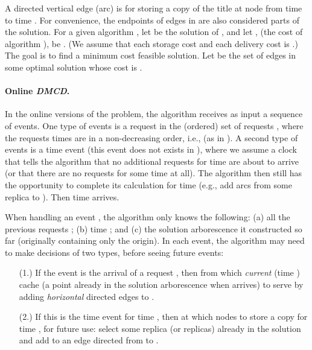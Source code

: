 \documentclass[11pt]{article}
\begin{document}
A directed vertical edge (arc)  is for storing a copy of the title at node  from time  to time .
For convenience, the endpoints  of edges in  are also considered parts of the solution.
For a given algorithm , let  be the solution of , and let , (the cost of  algorithm ), be .
(We assume that each storage cost and each delivery cost is .)
The goal is to find a minimum cost feasible solution.
Let  be the set of edges in some optimal solution whose cost is .













\vspace{-0.3cm}
\paragraph{\bf Online {\bf \em DMCD}.}
\label{app:online}
In the online versions of the problem,  the algorithm receives as input a sequence of events.
One type of events is a request in the (ordered)
set  of requests ,
where the requests times are in a non-decreasing order, i.e.,   (as in ).
A second type of events is a time event (this event does not exists in ),
where we assume a clock that tells the algorithm that
no additional requests for time  are about to arrive (or that there are no requests for some time  at all).
The algorithm then still has the opportunity to complete its calculation for time  (e.g., add arcs from some replica  to ).
Then time  arrives.

When handling an event ,
the algorithm only knows the following:
(a) all the previous requests
;
(b) time ; and
(c) the solution arborescence  it constructed so far (originally containing only the origin).
In each event,
the algorithm may need to
make decisions of two types, before seeing future events: \begin{itemize}
\vspace{-0.1cm}

\item [(1.)] If the event is the arrival of a request , then from which {\em current} (time ) cache
(a point already in the solution arborescence  when  arrives) to serve 
by adding {\em horizontal} directed edges to .


\item[(2.)]
If this is the time event for time , then at which nodes to store a copy for time , for future use: select some replica (or replicas)
 already in the solution  and add to  an edge directed from  to  .


\end{itemize}
\end{document}
